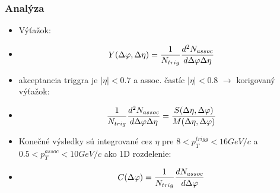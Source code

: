 \documentclass{beamer}
\begin{document}
	\begin{frame}
		\frametitle{Analýza}
		\begin{itemize}	
		 \item Výťažok: 
		 \item[]  \begin{equation} \centering 
		          Y(\Delta\varphi,\Delta\eta)=\frac{1}{N_{trig}}\frac{d^2N_{assoc}}{d\Delta\varphi\Delta\eta}
		          \end{equation}
		 \item akceptancia triggra je $\lvert\eta\rvert<0.7$ a assoc. častíc $\lvert\eta\rvert<0.8$ $\rightarrow$ korigovaný výťažok:
		 \item[]  \begin{equation} \centering
		          \frac{1}{N_{trig}}\frac{d^2N_{assoc}}{d\Delta\varphi\Delta\eta}=\frac{S(\Delta\eta,\Delta\varphi)}{M(\Delta\eta,\Delta\varphi)}
		          \end{equation}
		 \item Konečné výsledky sú integrované cez $\eta$ pre $8<p_T^{trigg}<16GeV/c$ a $0.5<p_T^{assoc}<10GeV/c$ ako 1D rozdelenie:
		 \item[]  \begin{equation} \centering
		          C(\Delta\varphi)=\frac{1}{N_{trig}}\frac{dN_{assoc}}{d\Delta\varphi}
		          \end{equation}
		\end{itemize}

	\end{frame}
	
\end{document}
